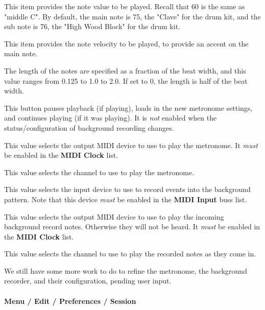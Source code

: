    This item provides the note value to be played.  Recall that 60 is the same
   as "middle C".  By default, the main note is 75, the "Clave" for the drum
   kit, and the sub note is 76, the "High Wood Block" for the drum kit.

   This item provides the note velocity to be played, to provide an accent on
   the main note.

   The length of the notes are specified as a fraction of the beat width, and
   this value ranges from 0.125 to 1.0 to 2.0.
   If set to 0, the length is half of the beat width.

   This button pauses playback (if playing),
   loads in the new metronome settings, and
   continues playing (if it was playing).
   It is \textsl{not} enabled when the status/configuration of background
   recording changes.

   This value selects the output MIDI device to use to play the metronome.
   It \textsl{must} be enabled in the \textbf{MIDI Clock} list.

   This value selects the channel to use to play the metronome.

   This value selects the input device to use to record events into the
   background pattern.
   Note that this device \textsl{must} be enabled in the \textbf{MIDI Input}
   buss list.

   This value selects the output MIDI device to use to play the incoming
   background record notes.  Otherwise they will not be heard.
   It \textsl{must} be enabled in the \textbf{MIDI Clock} list.

   This value selects the channel to use to play the recorded notes as
   they come in.

   We still have some more work to do to refine the metronome, the
   background recorder, and their configuration, pending user input.

\paragraph{Menu / Edit / Preferences / Session}
\label{paragraph:menu_edit_preferences_session}


